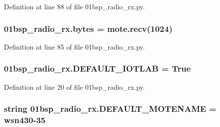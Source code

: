 Definition at line 88 of file 01bsp\+\_\+radio\+\_\+rx.\+py.

\subsubsection[{\texorpdfstring{bytes}{bytes}}]{\setlength{\rightskip}{0pt plus 5cm}01bsp\+\_\+radio\+\_\+rx.\+bytes = mote.\+recv(1024)}\hypertarget{namespace01bsp__radio__rx_ac80177cbe4706dd415309201ae9a0531}{}\label{namespace01bsp__radio__rx_ac80177cbe4706dd415309201ae9a0531}


Definition at line 85 of file 01bsp\+\_\+radio\+\_\+rx.\+py.

\subsubsection[{\texorpdfstring{D\+E\+F\+A\+U\+L\+T\+\_\+\+I\+O\+T\+L\+AB}{DEFAULT_IOTLAB}}]{ 01bsp\+\_\+radio\+\_\+rx.\+D\+E\+F\+A\+U\+L\+T\+\_\+\+I\+O\+T\+L\+AB = True}\hypertarget{namespace01bsp__radio__rx_a70be0965c27e9db09d803e6e531cffd1}{}\label{namespace01bsp__radio__rx_a70be0965c27e9db09d803e6e531cffd1}


Definition at line 20 of file 01bsp\+\_\+radio\+\_\+rx.\+py.

\subsubsection[{\texorpdfstring{D\+E\+F\+A\+U\+L\+T\+\_\+\+M\+O\+T\+E\+N\+A\+ME}{DEFAULT_MOTENAME}}]{\setlength{\rightskip}{0pt plus 5cm}string 01bsp\+\_\+radio\+\_\+rx.\+D\+E\+F\+A\+U\+L\+T\+\_\+\+M\+O\+T\+E\+N\+A\+ME = \textquotesingle{}wsn430-\/35\textquotesingle{}}\hypertarget{namespace01bsp__radio__rx_a6d4b4d7b47e25eda283a4b4d9169fc53}{}\label{namespace01bsp__radio__rx_a6d4b4d7b47e25eda283a4b4d9169fc53}



